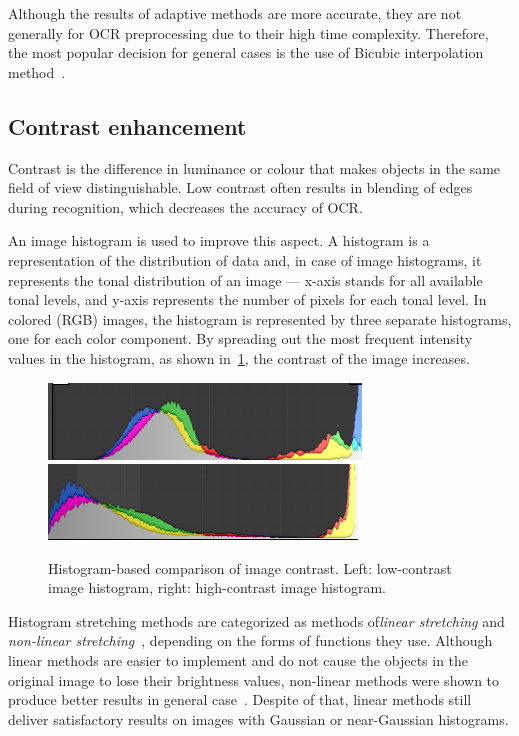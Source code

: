 Although the results of adaptive methods are more accurate, they are not generally for OCR preprocessing due to their high time complexity. Therefore, the most popular decision for general cases is the use of Bicubic interpolation method~\cite{interpolationComp}.

\subsection{Contrast enhancement} \label{contrastEnhancemet}

Contrast is the difference in luminance or colour that makes objects in the same field of view distinguishable. Low contrast often results in blending of edges during recognition, which decreases the accuracy of OCR.

An image histogram is used to improve this aspect. A histogram is a representation of the distribution of data and, in case of image histograms, it represents the tonal distribution of an image --- x-axis stands for all available tonal levels, and y-axis represents the number of pixels for each tonal level. In colored (RGB) images, the histogram is represented by three separate histograms, one for each color component. By spreading out the most frequent intensity values in the histogram, as shown in~\cref{fig:preprocessContrastComparison}, the contrast of the image increases.

\begin{figure}[t]
\centering
\includegraphics[width=0.4\linewidth]{img/preprocessing//histogram_low.png}
\qquad
\includegraphics[width=0.4\linewidth]{img/preprocessing/histogram_high.png}
\caption{Histogram-based comparison of image contrast. Left: low-contrast image histogram, right: high-contrast image histogram.}
\label{fig:preprocessContrastComparison}
\end{figure}

Histogram stretching methods are categorized as methods of\emph{linear stretching} and \emph{non-linear stretching}~\citep{linearNonStretch}, depending on the forms of functions they use. Although linear methods are easier to implement and do not cause the objects in the original image to lose their brightness values, non-linear methods were shown to produce better results in general case~\citep{chandpa1comparative}. Despite of that, linear methods still deliver satisfactory results on images with Gaussian or near-Gaussian histograms.

